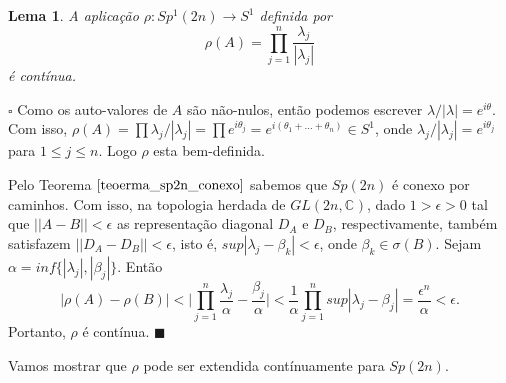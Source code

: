 \documentclass[12pt]{book}
\newtheorem{lema}[teorema]{Lema}
\newenvironment{prova}[1]{$\square$ #1}{\hfill$\blacksquare$}
\newcommand{\circulo}{S^{1}}
\newcommand{\complexo}[1]{\mathbb{C}^{#1}}
\newcommand{\generalgroup}[2]{GL(#1, #2)}
\newcommand{\generalgroupcomplexo}[1]{\generalgroup{#1}{\complexo{}}}
\newcommand{\gruposimpletico}[1]{Sp(#1)}
\newcommand{\gruposimpleticoespecial}[1]{Sp^{1}(#1)}
\newcommand{\norma}[1]{||#1||}
\begin{document}
	\begin{lema}
		A aplicação $\rho:\gruposimpleticoespecial{2n} \to \circulo$ definida por 
		$$
		\rho(A) = \prod_{j=1}^{n}\frac{\lambda_{j}}{|\lambda_{j}|}
		$$
		é contínua.
	\end{lema}
	\begin{prova}
		Como os auto-valores de $A$ são não-nulos, então podemos escrever $\lambda/|\lambda| = e^{i\theta}$. Com isso, $\rho(A)=\prod \lambda_{j}/|\lambda_{j}| = \prod e^{i\theta_{j}} = e^{i(\theta_{1}+\dots +\theta_{n})} \in \circulo$, onde $\lambda_{j}/|\lambda_{j}| = e^{i\theta_{j}}$ para $1\leq j \leq n$. Logo $\rho$ esta bem-definida.
		
		Pelo Teorema $\ref{teoerma_sp2n_conexo}$ sabemos que $\gruposimpletico{2n}$ é conexo por caminhos. Com isso, na topologia herdada de $\generalgroupcomplexo{2n}$, dado $1>\epsilon >0$ tal que $\norma{A-B}< \epsilon$ as representação diagonal $D_{A}$ e $D_{B}$, respectivamente, também satisfazem $\norma{D_{A}-D_{B}}< \epsilon$, isto é, $sup|\lambda_{j}-\beta_{k}| < \epsilon$, onde $\beta_{k} \in \sigma(B)$. Sejam $\alpha = inf \{|\lambda_{j}|,|\beta_{j}|\}$. Então
		$$
		|\rho(A) -\rho(B)| < \Big|\prod_{j=1}^{n} \frac{\lambda_{j}}{\alpha} - \frac{\beta_{j}}{\alpha} \Big| <\frac{1}{\alpha}\prod_{j=1}^{n} sup|\lambda_{j} - \beta_{j}|=\frac{\epsilon^{n}}{\alpha}<\epsilon.
		$$
		Portanto, $\rho$ é contínua.
	\end{prova}		
	
	Vamos mostrar que $\rho$ pode ser extendida contínuamente para $\gruposimpletico{2n}$.
	
\end{document}
